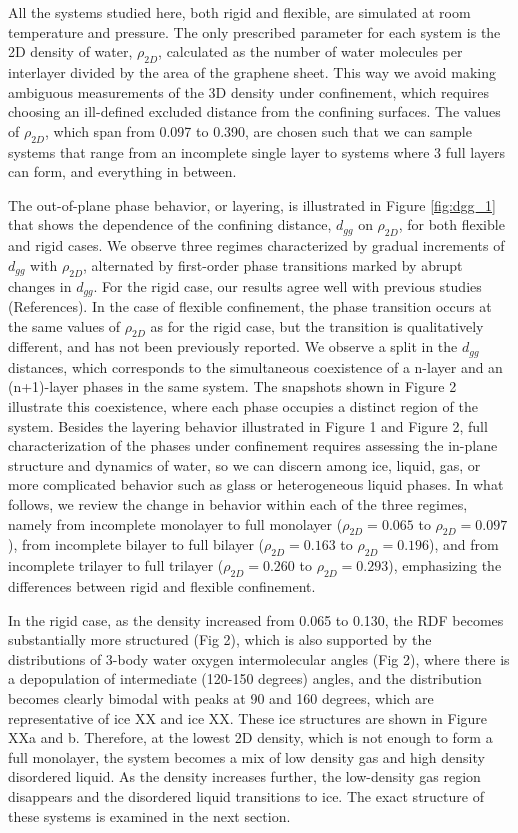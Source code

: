 \documentclass[12pt]{article}
\begin{document}
All the systems studied here, both rigid and flexible, are simulated at room temperature and pressure. The only prescribed parameter for each system is the 2D density of water, \(\rho_{2D}\), calculated as the number of water molecules per interlayer divided by the area of the graphene sheet. This way we avoid making ambiguous measurements of the 3D density under confinement, which requires choosing an ill-defined excluded distance from the confining surfaces. The values of \(\rho_{2D}\), which span from 0.097 to 0.390, are chosen such that we can sample systems that range from an incomplete single layer to systems where 3 full layers can form, and everything in between.

The out-of-plane phase behavior, or layering, is illustrated in Figure \ref{fig:dgg_1} that shows the dependence of the confining distance, \(d_{gg}\) on \(\rho_{2D}\), for both flexible and rigid cases. We observe three regimes characterized by gradual increments of \(d_{gg}\) with \(\rho_{2D}\), alternated by first-order phase transitions marked by abrupt changes in \(d_{gg}\). For the rigid case, our results agree well with previous studies (References). In the case of flexible confinement, the phase transition occurs at the same values of \(\rho_{2D}\) as for the rigid case, but the transition is qualitatively different, and has not been previously reported. We observe a split in the \(d_{gg}\) distances, which corresponds to the simultaneous coexistence of a n-layer and an (n+1)-layer phases in the same system. The snapshots shown in Figure 2 illustrate this coexistence, where each phase occupies a distinct region of the system.
Besides the layering behavior illustrated in Figure 1 and Figure 2, full characterization of the phases under confinement requires assessing the in-plane structure and dynamics of water, so we can discern among ice, liquid, gas, or more complicated behavior such as glass or heterogeneous liquid phases. In what follows, we review the change in behavior within each of the three regimes, namely from incomplete monolayer to full monolayer (\(\rho_{2D}=0.065\) to \(\rho_{2D}=0.097\)), from incomplete bilayer to full bilayer (\(\rho_{2D}=0.163\) to \(\rho_{2D}=0.196\)), and from incomplete trilayer to full trilayer (\(\rho_{2D}=0.260\) to \(\rho_{2D}=0.293\)), emphasizing the differences between rigid and flexible confinement.

 In the rigid case, as the density increased from 0.065 to 0.130, the RDF becomes substantially more structured (Fig 2),  which is also supported by the distributions of 3-body water oxygen intermolecular angles (Fig 2), where there is a depopulation of intermediate (120-150 degrees) angles, and the distribution becomes clearly bimodal with peaks at 90 and 160 degrees, which are representative of ice XX and ice XX. These ice structures are shown in Figure XXa and b. Therefore, at the lowest 2D density, which is not enough to form a full monolayer, the system becomes a mix of low density gas and high density disordered liquid. As the density increases further, the low-density gas region disappears and the disordered liquid transitions to ice. The exact structure of these systems is examined in the next section.
\end{document}

